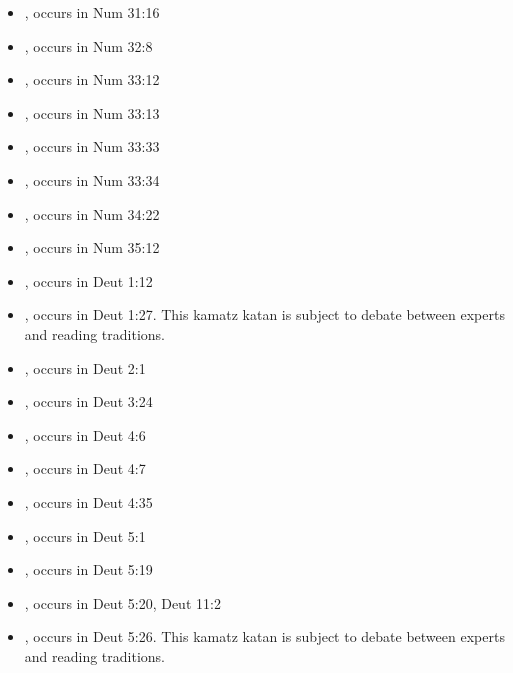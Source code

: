 \documentclass[14pt]{article}
\begin{document}
\begin{itemize}
\item {}, occurs in Num 31:16

\item {}, occurs in Num 32:8

\item {}, occurs in Num 33:12

\item {}, occurs in Num 33:13

\item {}, occurs in Num 33:33

\item {}, occurs in Num 33:34

\item {}, occurs in Num 34:22

\item {}, occurs in Num 35:12

\item {}, occurs in Deut 1:12

\item {}, occurs in Deut 1:27. This kamatz katan is subject to debate between experts and reading traditions.

\item {}, occurs in Deut 2:1

\item {}, occurs in Deut 3:24

\item {}, occurs in Deut 4:6

\item {}, occurs in Deut 4:7

\item {}, occurs in Deut 4:35

\item {}, occurs in Deut 5:1

\item {}, occurs in Deut 5:19

\item {}, occurs in Deut 5:20, Deut 11:2

\item {}, occurs in Deut 5:26. This kamatz katan is subject to debate between experts and reading traditions.


\end{itemize}
\end{document}
